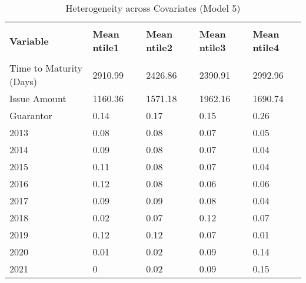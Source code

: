 \begin{table}[H]
\caption{Heterogeneity across Covariates (Model 5)}
\label{Het}
\footnotesize
\begin{tabular}{lllll}
\\[-1.8ex]\hline 
\hline \\[-1.8ex] 
{\color[HTML]{333333} \textbf{Variable}} & {\color[HTML]{333333} \textbf{Mean ntile1}} & {\color[HTML]{333333} \textbf{Mean ntile2}} & {\color[HTML]{333333} \textbf{Mean ntile3}} & {\color[HTML]{333333} \textbf{Mean ntile4}} \\
\hline \\[-1.8ex] 
Time to   Maturity (Days) & \cellcolor[HTML]{78C78D}2910.99 & \cellcolor[HTML]{F3F9F8}2426.86 & \cellcolor[HTML]{FCFCFF}2390.91 & \cellcolor[HTML]{63BE7B}2992.96 \\
Issue Amount & \cellcolor[HTML]{FCFCFF}1160.36 & \cellcolor[HTML]{AEDDBC}1571.18 & \cellcolor[HTML]{63BE7B}1962.16 & \cellcolor[HTML]{97D3A8}1690.74 \\
Guarantor & \cellcolor[HTML]{E4F2EA}0.14 & \cellcolor[HTML]{DEF0E5}0.17 & \cellcolor[HTML]{E2F2E8}0.15 & \cellcolor[HTML]{CEEAD8}0.26 \\
2013 & \cellcolor[HTML]{EEF7F3}0.08 & \cellcolor[HTML]{EEF7F3}0.08 & \cellcolor[HTML]{F0F7F5}0.07 & \cellcolor[HTML]{F4F9F8}0.05 \\
2014 & \cellcolor[HTML]{ECF6F2}0.09 & \cellcolor[HTML]{EEF7F3}0.08 & \cellcolor[HTML]{F0F7F5}0.07 & \cellcolor[HTML]{F5FAF9}0.04 \\
2015 & \cellcolor[HTML]{E9F5EF}0.11 & \cellcolor[HTML]{EEF7F3}0.08 & \cellcolor[HTML]{F0F7F5}0.07 & \cellcolor[HTML]{F5FAF9}0.04 \\
2016 & \cellcolor[HTML]{E7F4ED}0.12 & \cellcolor[HTML]{EEF7F3}0.08 & \cellcolor[HTML]{F2F8F6}0.06 & \cellcolor[HTML]{F2F8F6}0.06 \\
2017 & \cellcolor[HTML]{ECF6F2}0.09 & \cellcolor[HTML]{ECF6F2}0.09 & \cellcolor[HTML]{EEF7F3}0.08 & \cellcolor[HTML]{F5FAF9}0.04 \\
2018 & \cellcolor[HTML]{F9FBFC}0.02 & \cellcolor[HTML]{F0F7F5}0.07 & \cellcolor[HTML]{E7F4ED}0.12 & \cellcolor[HTML]{F0F7F5}0.07 \\
2019 & \cellcolor[HTML]{E7F4ED}0.12 & \cellcolor[HTML]{E7F4ED}0.12 & \cellcolor[HTML]{F0F7F5}0.07 & \cellcolor[HTML]{FBFCFE}0.01 \\
2020 & \cellcolor[HTML]{FBFCFE}0.01 & \cellcolor[HTML]{F9FBFC}0.02 & \cellcolor[HTML]{ECF6F2}0.09 & \cellcolor[HTML]{E4F2EA}0.14 \\
2021 & \cellcolor[HTML]{FCFCFF}0 & \cellcolor[HTML]{F9FBFC}0.02 & \cellcolor[HTML]{ECF6F2}0.09 & \cellcolor[HTML]{E2F2E8}0.15 \\

\end{tabular}
\end{table}

